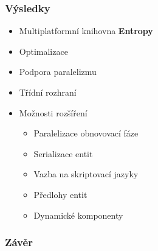 \documentclass[10pt,xcolor=pdflatex, notes=only]{beamer}
\begin{document}
\fi

\begin{frame}
	\frametitle{Výsledky}
	\begin{itemize}
		\item Multiplatformní knihovna \textbf{Entropy}
		\item Optimalizace
		\item Podpora paralelizmu
		\item Třídní rozhraní
		\item Možnosti rozšíření
		\begin{itemize}
			\item Paralelizace obnovovací fáze
			\item Serializace entit
			\item Vazba na skriptovací jazyky
			\item Předlohy entit
			\item Dynamické komponenty
		\end{itemize}
	\end{itemize}
\end{frame}


\begin{frame}
	\frametitle{Závěr}
	\begin{center}
	\end{center}
\end{frame}
\end{document}
